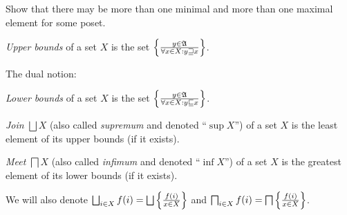 \begin{xca}
Show that there may be more than one minimal and more than one maximal
element for some poset.\end{xca}
\begin{defn}
\emph{Upper bounds} of a set $X$ is the set
$\left\{ \frac{y\in\mathfrak{A}}{\forall x\in X:y\sqsupseteq x}\right\}$.
\end{defn}
The dual notion:
\begin{defn}
\emph{Lower bounds} of a set $X$ is the set
$\left\{ \frac{y\in\mathfrak{A}}{\forall x\in X:y\sqsubseteq x}\right\}$.
\end{defn}

\begin{defn}
\emph{Join} $\bigsqcup X$ (also called
\emph{supremum} and denoted ``$\sup X$'') of a set $X$ is the
least element of its upper bounds (if it exists).
\end{defn}

\begin{defn}
\emph{Meet} $\bigsqcap X$ (also called
\emph{infimum} and denoted ``$\inf X$'') of a set $X$ is the greatest
element of its lower bounds (if it exists).
\end{defn}
We will also denote $\bigsqcup_{i\in X}f(i)=\bigsqcup\setcond{f(i)}{x\in X}$
and $\bigsqcap_{i\in X}f(i)=\bigsqcap\left\{ \frac{f(i)}{x\in X}\right\}$.

